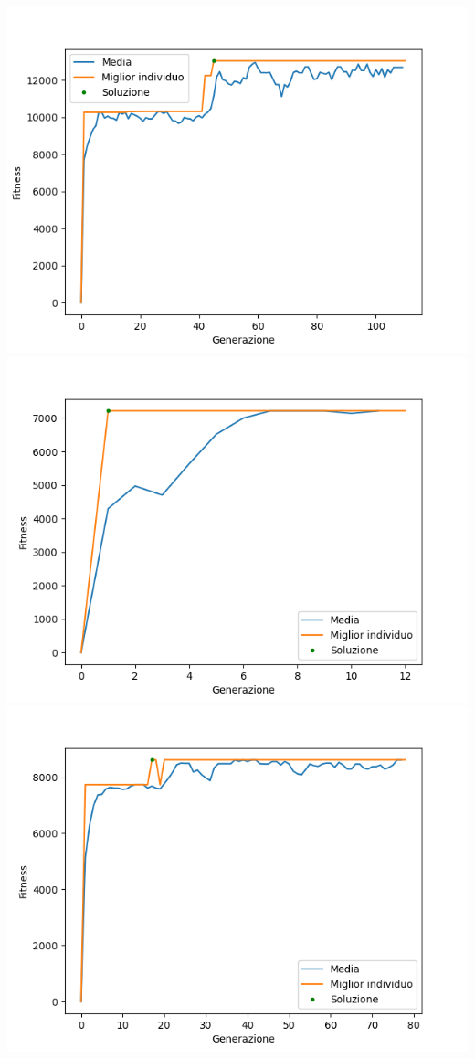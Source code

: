 \documentclass{CSUniSchoolLabReport}
\begin{document}
\begin{center}
	\includegraphics[scale=0.25]{results/15}
	\includegraphics[scale=0.25]{results/16}
	\includegraphics[scale=0.25]{results/17}

\end{center}
\end{document}
